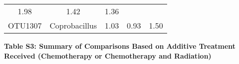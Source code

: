 \documentclass[12pt,]{article}
\begin{document}
\begin{longtable}[]{@{}ccccc@{}}
\begin{minipage}[t]{0.17\columnwidth}
1.98\strut
\end{minipage} & \begin{minipage}[t]{0.25\columnwidth}\centering\strut
1.42\strut
\end{minipage} & \begin{minipage}[t]{0.19\columnwidth}\centering\strut
1.36\strut
\end{minipage}\tabularnewline
\begin{minipage}[t]{0.07\columnwidth}\centering\strut
OTU1307\strut
\end{minipage} & \begin{minipage}[t]{0.18\columnwidth}\centering\strut
Coprobacillus\strut
\end{minipage} & \begin{minipage}[t]{0.17\columnwidth}\centering\strut
1.03\strut
\end{minipage} & \begin{minipage}[t]{0.25\columnwidth}\centering\strut
0.93\strut
\end{minipage} & \begin{minipage}[t]{0.19\columnwidth}\centering\strut
1.50\strut
\end{minipage}\tabularnewline
\bottomrule
\end{longtable}

\normalsize
\newpage

\textbf{Table S3: Summary of Comparisons Based on Additive Treatment
Received (Chemotherapy or Chemotherapy and Radiation)} \footnotesize
\end{document}
